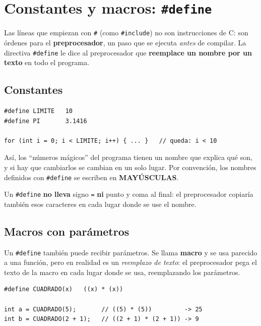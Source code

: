 \section{Constantes y macros: \texttt{\#define}}

Las líneas que empiezan con \texttt{\#} (como \texttt{\#include}) no son instrucciones de C: son órdenes para el \textbf{preprocesador}, un paso que se ejecuta \emph{antes} de compilar. La directiva \texttt{\#define} le dice al preprocesador que \textbf{reemplace un nombre por un texto} en todo el programa.

\subsection{Constantes}

\begin{lstlisting}[style=estilo-c]
#define LIMITE   10
#define PI       3.1416

for (int i = 0; i < LIMITE; i++) { ... }   // queda: i < 10
\end{lstlisting}

Así, los ``números mágicos'' del programa tienen un nombre que explica qué son, y si hay que cambiarlos se cambian en un solo lugar. Por convención, los nombres definidos con \texttt{\#define} se escriben en \textbf{MAYÚSCULAS}.

\begin{advertenciabox}
Un \texttt{\#define} \textbf{no lleva} signo \texttt{=} \textbf{ni} punto y coma al final: el preprocesador copiaría también esos caracteres en cada lugar donde se use el nombre.
\end{advertenciabox}

\subsection{Macros con parámetros}

Un \texttt{\#define} también puede recibir parámetros. Se llama \textbf{macro} y se usa parecido a una función, pero en realidad es un \emph{reemplazo de texto}: el preprocesador pega el texto de la macro en cada lugar donde se usa, reemplazando los parámetros.

\begin{lstlisting}[style=estilo-c]
#define CUADRADO(x)   ((x) * (x))

int a = CUADRADO(5);       // ((5) * (5))         -> 25
int b = CUADRADO(2 + 1);   // ((2 + 1) * (2 + 1)) -> 9
\end{lstlisting}

